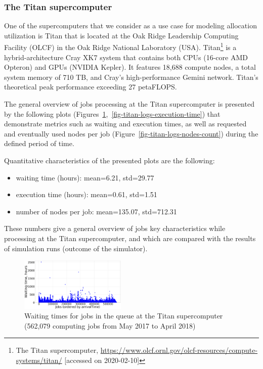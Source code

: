 \subsubsection{The Titan supercomputer}
\label{sec-experiments-1-1}

One of the supercomputers that we consider as a use case for modeling allocation utilization is Titan that is located at the Oak Ridge Leadership Computing Facility (OLCF) in the Oak Ridge National Laboratory (USA). Titan\footnote{The Titan supercomputer, \url{https://www.olcf.ornl.gov/olcf-resources/compute-systems/titan/} [accessed on 2020-02-10]} is a hybrid-architecture Cray XK7 system that contains both CPUs (16-core AMD Opteron) and GPUs (NVIDIA Kepler). It features 18,688 compute nodes, a total system memory of 710 TB, and Cray's high-performance Gemini network. Titan's theoretical peak performance exceeding 27 petaFLOPS.

The general overview of jobs processing at the Titan supercomputer is presented by the following plots (Figures~\ref{fig-titan-logs-waiting-time},~\ref{fig-titan-logs-execution-time}) that demonstrate metrics such as waiting and execution times, as well as requested and eventually used nodes per job (Figure~\ref{fig-titan-logs-nodes-count}) during the defined period of time.

Quantitative characteristics of the presented plots are the following:
\begin{itemize}
    \item waiting time (hours): mean=6.21, std=29.77
    \item execution time (hours): mean=0.61, std=1.51
    \item number of nodes per job: mean=135.07, std=712.31
\end{itemize}
These numbers give a general overview of jobs key characteristics while processing at the Titan supercomputer, and which are compared with the results of simulation runs (outcome of the simulator).

\begin{figure}
    \centering
    \includegraphics[width=0.45\textwidth]{pics/titan-logs-waiting-time.png}
    \caption{Waiting times for jobs in the queue at the Titan supercomputer (562,079 computing jobs from May 2017 to April 2018)}
    \label{fig-titan-logs-waiting-time} 
\end{figure}

